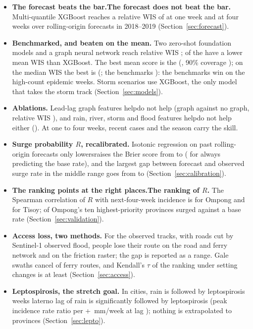 \begin{itemize}
\item \textbf{\ifForecastBeats The forecast beats the bar.\else The forecast does not beat the bar.\fi} Multi-quantile XGBoost reaches a relative WIS of \relWISHOne{} at one week and \relWISHFour{} at four weeks over \nScored{} rolling-origin forecasts in 2018--2019 (Section~\ref{sec:forecast}).
\item \textbf{Benchmarked\ifAnyBenchBeatsXGB, and beaten on the mean\fi.} Two zero-shot foundation models and a graph neural network reach relative WIS \benchRelWISRange{}; \nBenchBeatXGB{} of the \nBench{} have a lower mean WIS than XGBoost. The best mean score is the \bestMeanLabel{} (\bestMeanRelWIS{}, 90\% coverage \bestMeanCov{}); on the median WIS the best is \bestMedianLabel{} (\bestMedianWIS{}; the benchmarks \mwBenchRange{})\ifBenchWinHigh: the benchmarks win on the high-count epidemic weeks\fi. Storm scenarios use XGBoost, the only model that takes the storm track (Section~\ref{sec:models}).
\item \textbf{Ablations.} Lead-lag graph features \ifGraphHelps help\else do not help\fi{} (graph against no graph, relative WIS \relWISGraph{}), and rain, river, storm and flood features \ifEnvHelps help\else do not help either\fi{} (\relWISEnv{}).\ifGraphHelps\else\ifEnvHelps\else{} At one to four weeks, recent cases and the season carry the skill.\fi\fi
\item \textbf{Surge probability $R$, recalibrated.} Isotonic regression on past rolling-origin forecasts only \ifCalImproves lowers\else raises\fi{} the Brier score from \brierRaw{} to \brierCal{} (\brierClim{} for always predicting the base rate), and the largest gap between forecast and observed surge rate in the middle range goes from \gapRaw{} to \gapCal{} (Section~\ref{sec:calibration}).
\item \textbf{\ifRRanksWell The ranking points at the right places.\else The ranking of $R$.\fi} The Spearman correlation of $R$ with next-four-week incidence is \rhoROmpong{} for Ompong and \rhoRTisoy{} for Tisoy; \topTenSurgedOmpong{} of Ompong's ten highest-priority provinces surged against a \surgeRateOmpong{} base rate (Section~\ref{sec:validation}).
\item \textbf{Access loss, two methods.} For the observed tracks, with roads cut by Sentinel-1 observed flood, \cutNetRange{} people lose their route on the road and ferry network and \cutRasterRange{} on the friction raster; the gap is reported as a range. Gale swaths cancel \ferriesRange{} of \nFerry{} ferry routes, and Kendall's $\tau$ of the ranking under \nSensVariants{} setting changes is at least \tauMinAll{} (Section~\ref{sec:access}).
\item \textbf{Leptospirosis, the stretch goal.} In \leptoNCities{} cities, \ifCitySig rain is followed by leptospirosis \citySigRange{} weeks later\else no lag of rain is significantly followed by leptospirosis\fi{} (peak incidence rate ratio \cityPeakIRR{} per +\leptoRainPer{}~mm/week at lag \cityPeakLag{}); nothing is extrapolated to provinces (Section~\ref{sec:lepto}).
\end{itemize}


